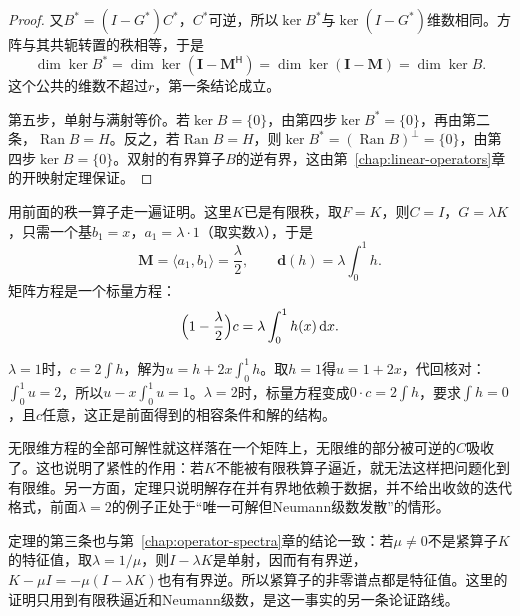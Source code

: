 \begin{proof}
又$B^*=(I-G^*)C^*$，$C^*$可逆，所以$\ker B^*$与$\ker(I-G^*)$维数相同。方阵与其共轭转置的秩相等，于是
\[
  \dim\ker B^*=\dim\ker(\bm I-\bm M^{\mathsf H})=\dim\ker(\bm I-\bm M)=\dim\ker B.
\]
这个公共的维数不超过$r$，第一条结论成立。

第五步，单射与满射等价。若$\ker B=\{0\}$，由第四步$\ker B^*=\{0\}$，再由第二条，$\operatorname{Ran}B=H$。反之，若$\operatorname{Ran}B=H$，则$\ker B^*=(\operatorname{Ran}B)^\perp=\{0\}$，由第四步$\ker B=\{0\}$。双射的有界算子$B$的逆有界，这由第~\ref{chap:linear-operators}章的开映射定理保证。
\end{proof}

用前面的秩一算子走一遍证明。这里$K$已是有限秩，取$F=K$，则$C=I$，$G=\lambda K$，只需一个基$b_1=x$，$a_1=\lambda\cdot1$（取实数$\lambda$），于是
\[
  \bm M=\langle a_1,b_1\rangle=\frac\lambda2,\qquad \bm d(h)=\lambda\int_0^1h.
\]
矩阵方程是一个标量方程：
\[
  \Bigl(1-\frac\lambda2\Bigr)c=\lambda\int_0^1h(x)\,\mathrm dx.
\]

$\lambda=1$时，$c=2\int h$，解为$u=h+2x\int_0^1h$。取$h=1$得$u=1+2x$，代回核对：$\int_0^1u=2$，所以$u-x\int_0^1u=1$。$\lambda=2$时，标量方程变成$0\cdot c=2\int h$，要求$\int h=0$，且$c$任意，这正是前面得到的相容条件和解的结构。

无限维方程的全部可解性就这样落在一个矩阵上，无限维的部分被可逆的$C$吸收了。这也说明了紧性的作用：若$K$不能被有限秩算子逼近，就无法这样把问题化到有限维。另一方面，定理只说明解存在并有界地依赖于数据，并不给出收敛的迭代格式，前面$\lambda=2$的例子正处于“唯一可解但Neumann级数发散”的情形。

定理的第三条也与第~\ref{chap:operator-spectra}章的结论一致：若$\mu\neq0$不是紧算子$K$的特征值，取$\lambda=1/\mu$，则$I-\lambda K$是单射，因而有有界逆，$K-\mu I=-\mu(I-\lambda K)$也有有界逆。所以紧算子的非零谱点都是特征值。这里的证明只用到有限秩逼近和Neumann级数，是这一事实的另一条论证路线。
